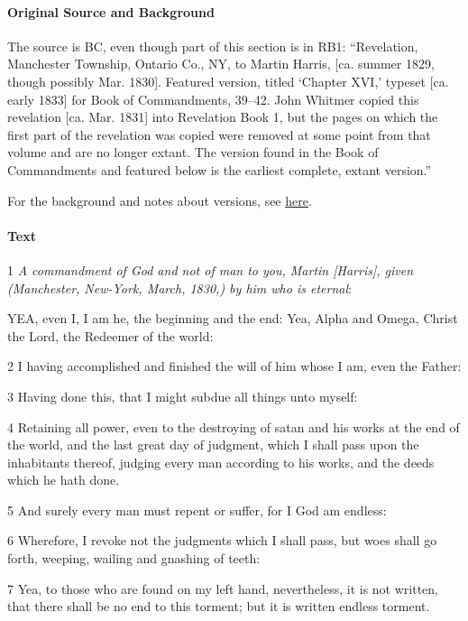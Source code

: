 			\paragraph{Original Source and Background}
			
				The source is BC, even though part of this section is in RB1: ``Revelation, Manchester Township, Ontario Co., NY, to Martin Harris, [ca. summer 1829, though possibly Mar. 1830]. Featured version, titled `Chapter XVI,' typeset [ca. early 1833] for Book of Commandments, 39--42. John Whitmer copied this revelation [ca. Mar. 1831] into Revelation Book 1, but the pages on which the first part of the revelation was copied were removed at some point from that volume and are no longer extant. The version found in the Book of Commandments and featured below is the earliest complete, extant version.''
				
				For the background and notes about versions, see \hyperref[DC19-HB]{here}.
			
			\paragraph{Text}
			
				1 \textit{A commandment of God and not of man to you, Martin [Harris], given (Manchester, New-York, March, 1830,) by him who is eternal}:

				YEA, even I, I am he, the beginning and the end: Yea, Alpha and Omega, Christ the Lord, the Redeemer of the world:

				2 I having accomplished and finished the will of him whose I am, even the Father:

				3 Having done this, that I might subdue all things unto myself:

				4 Retaining all power, even to the destroying of satan and his works at the end of the world, and the last great day of judgment, which I shall pass upon the inhabitants thereof, judging every man according to his works, and the deeds which he hath done.

				5 And surely every man must repent or suffer, for I God am endless:

				6 Wherefore, I revoke not the judgments which I shall pass, but woes shall go forth, weeping, wailing and gnashing of teeth:

				7 Yea, to those who are found on my left hand, nevertheless, it is not written, that there shall be no end to this torment; but it is written endless torment.

